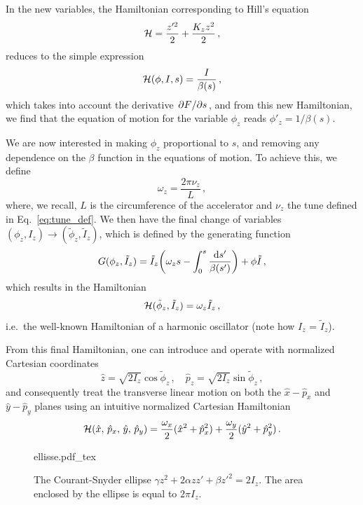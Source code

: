 In the new variables, the Hamiltonian corresponding to Hill's equation
\begin{equation} 
    \mathcal{H} = \frac{z'^2}{2} + \frac{K_z z^2}{2} \,,
\end{equation}
reduces to the simple expression
\begin{equation}
	\mathcal{H}(\phi,I,s) = \frac{I}{\beta(s)}\, ,
\end{equation}
which takes into account the derivative $\pdv*{F}{s}$, and from this new Hamiltonian, we find that the equation of motion for the variable $\phi_z$ reads $\phi'_z = 1/\beta(s)$. 

We are now interested in making $\phi_z$ proportional to $s$, and removing any dependence on the $\beta$ function in the equations of motion. To achieve this, we define 
\begin{equation}
    \omega_z = \frac{2\pi\nu_z}{L} \,,
\end{equation}
where, we recall, $L$ is the circumference of the accelerator and $\nu_z$ the tune defined in Eq.~\eqref{eq:tune_def}. We then have the final change of variables $(\phi_z,I_z)\to(\tilde\phi_z, \tilde I_z)$, which is defined by the generating function
%
\begin{equation}
	G(\phi_z,\tilde I_z) = \tilde I_z\qty(\omega_z s - \int_0^s\frac{\dd s'}{\beta(s')})+\phi\tilde I\, ,
\end{equation}
%
which results in the Hamiltonian
%
\begin{equation}
	\mathcal{H}(\tilde \phi_z,\tilde I_z) = \omega_z \tilde I_z\,,
	\label{eq:harm_ham}
 \end{equation}
%
i.e.\ the well-known Hamiltonian of a harmonic oscillator (note how $I_z$ = $\tilde{I}_z$).

From this final Hamiltonian, one can introduce and operate with normalized Cartesian coordinates 
\begin{equation}
    \hat z=\sqrt{2I_z}\cos\tilde{\phi}_z\,,\quad \hat p_z=\sqrt{2I_z}\sin\tilde{\phi}_z \,,
    \label{eq:2:cart_eq}
\end{equation}
and consequently treat the transverse linear motion on both the $\hat x-\hat p_x$ and $\hat y-\hat p_y$ planes using an intuitive normalized Cartesian Hamiltonian
%
\begin{equation}
	\mathcal{H}(\hat x,\, \hat p_x,\, \hat y,\, \hat p_y) = \frac{\omega_x}{2}(\hat x^2 +\hat p_x^2) + \frac{\omega_y}{2}(\hat y^2+\hat p_y^2)\, .
	\label{eq:linham}
\end{equation}
%

\begin{figure}
    \centering
    \def\svgwidth{0.75\columnwidth}
    {ellisse.pdf_tex}
    \caption{The Courant-Snyder ellipse $\gamma z^2 + 2\alpha zz' + \beta z'^2=2I_z$. The area enclosed by the ellipse is equal to $2\pi I_z$. }
    \label{fig:coursnyd}
\end{figure}


